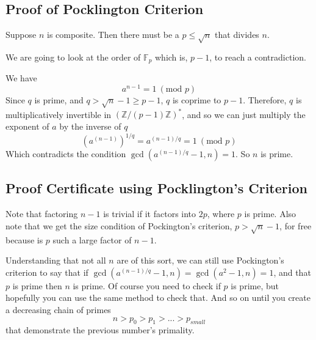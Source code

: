 \documentclass[]{article}
\newcommand{\Z}{\mathbb{Z}}
\newcommand{\ZMZ}[1]{\Z/#1\Z}
\newcommand{\F}{\mathbb{F}}
\newcommand{\Mod}[1]{\ (\text{mod }#1)}
\begin{document}
\subsection{Proof of Pocklington Criterion}


Suppose $n$ is composite. Then there must be a $p \le \sqrt{n}$ that divides $n$.

We are going to look at the order of $\F_p$ which is, $p-1$, to reach a contradiction.

We have
$$a^{n-1} = 1 \Mod{p}$$
Since $q$ is prime, and $q > \sqrt{n}-1 \ge p-1$, $q$ is coprime to $p-1$. Therefore, $q$ is multiplicatively invertible in $(\ZMZ{(p-1)})^*$, and so we can just multiply the exponent of $a$ by the inverse of $q$
$$(a^{(n-1)})^{1/q} = a^{(n-1)/q} = 1 \Mod{p}$$
Which contradicts the condition $\gcd(a^{(n-1)/q}-1,n) = 1$. So $n$ is prime.

\subsection{Proof Certificate using Pocklington's Criterion}

Note that factoring $n-1$ is trivial if it factors into $2p$, where $p$ is prime.
Also note that we get the size condition of Pockington's criterion, $p > \sqrt{n}-1$, for free because is $p$ such a large factor of $n-1$.

Understanding that not all $n$ are of this sort, we can still use Pockington's criterion to say that if $\gcd(a^{(n-1)/q}-1,n) = \gcd(a^2-1,n) = 1$, and that $p$ is prime then $n$ is prime. Of course you need to check if $p$ is prime, but hopefully you can use the same method to check that. And so on until you create a decreasing chain of primes
$$n > p_0 > p_1 > ... > p_{small}$$
that demonstrate the previous number's primality.
\end{document}
